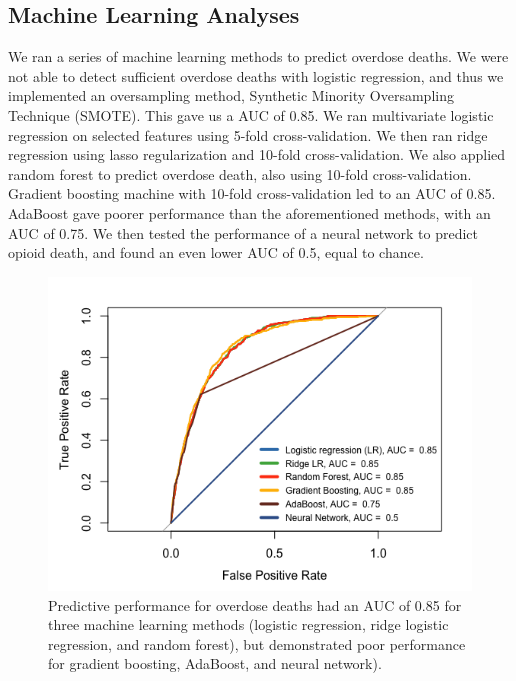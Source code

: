 \documentclass[twoside,10.5pt]{article}
\begin{document}
\subsection{Machine Learning Analyses}
We ran a series of machine learning methods to predict overdose deaths. We were not able to detect sufficient overdose deaths with logistic regression, and thus we implemented an oversampling method, Synthetic Minority Oversampling Technique (SMOTE). This gave us a AUC of 0.85. 
We ran multivariate logistic regression on selected features using 5-fold cross-validation.
We then ran ridge regression using lasso regularization and 10-fold cross-validation.
We also applied random forest to predict overdose death, also using 10-fold cross-validation. 
Gradient boosting machine with 10-fold cross-validation led to an AUC of 0.85.
AdaBoost gave poorer performance than the aforementioned methods, with an AUC of 0.75. We then tested the performance of a neural network to predict opioid death, and found an even lower AUC of 0.5, equal to chance. 

\begin{figure}[htp]
\centering
\includegraphics[width=12cm]{images/AUC_ML_opioids.png}
\caption{Predictive performance for overdose deaths had an AUC of 0.85 for three machine learning methods (logistic regression, ridge logistic regression, and random forest), but demonstrated poor performance for gradient boosting, AdaBoost, and neural network).}
\label{fig:lion}
\end{figure}
\end{document}
